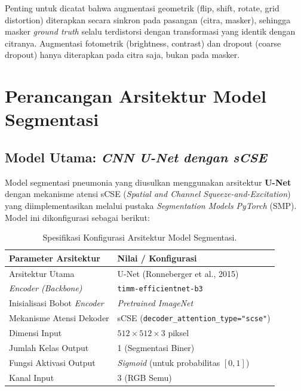 \documentclass[12pt,a4paper,oneside]{book}
\begin{document}
Penting untuk dicatat bahwa augmentasi geometrik (flip, shift, rotate, grid distortion) diterapkan secara sinkron pada pasangan (citra, masker), sehingga masker \textit{ground truth} selalu terdistorsi dengan transformasi yang identik dengan citranya. Augmentasi fotometrik (brightness, contrast) dan dropout (coarse dropout) hanya diterapkan pada citra saja, bukan pada masker.

\section{Perancangan Arsitektur Model Segmentasi}

\subsection{Model Utama: \textit{CNN U-Net dengan sCSE}}

Model segmentasi pneumonia yang diusulkan menggunakan arsitektur \textbf{U-Net} dengan mekanisme atensi sCSE (\textit{Spatial and Channel Squeeze-and-Excitation}) yang diimplementasikan melalui pustaka \textit{Segmentation Models PyTorch} (SMP). Model ini dikonfigurasi sebagai berikut:

\begin{table}[H]
  \centering
  \caption{Spesifikasi Konfigurasi Arsitektur Model Segmentasi.}
  \label{tab:model_config}
  \begin{tabular}{l l}
    \toprule
    \textbf{Parameter Arsitektur} & \textbf{Nilai / Konfigurasi} \\
    \midrule
    Arsitektur Utama              & U-Net (Ronneberger et al., 2015)   \\
    \textit{Encoder (Backbone)}   & \texttt{timm-efficientnet-b3}      \\
    Inisialisasi Bobot \textit{Encoder} & \textit{Pretrained ImageNet} \\
    Mekanisme Atensi Dekoder      & sCSE (\texttt{decoder\_attention\_type="scse"}) \\
    Dimensi Input                 & $512 \times 512 \times 3$ piksel    \\
    Jumlah Kelas Output           & 1 (Segmentasi Biner)               \\
    Fungsi Aktivasi Output        & \textit{Sigmoid} (untuk probabilitas $[0, 1]$) \\
    Kanal Input                   & 3 (RGB Semu)                       \\
    \bottomrule
  \end{tabular}
\end{table}
\end{document}
